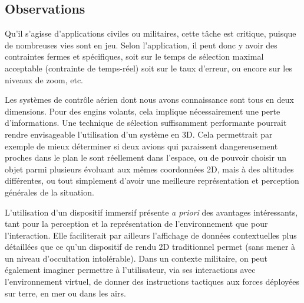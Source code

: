 	\addtocounter{footnote}{-1}
	\addtocounter{footnote}{1}
	
	\subsection{Observations}
	Qu'il s'agisse d'applications civiles ou militaires, cette tâche est critique, puisque de nombreuses vies sont en jeu. Selon l'application, il peut donc y avoir des contraintes fermes et spécifiques, soit sur le temps de sélection maximal acceptable (contrainte de temps-réel) soit sur le taux d'erreur, ou encore sur les niveaux de zoom, etc.

	Les systèmes de contrôle aérien dont nous avons connaissance sont tous en deux dimensions. Pour des engins volants, cela implique nécessairement une perte d'informations. Une technique de sélection suffisamment performante pourrait rendre envisageable l'utilisation d'un système en 3D. Cela permettrait par exemple de mieux déterminer si deux avions qui paraissent dangereusement proches dans le plan le sont réellement dans l'espace, ou de pouvoir choisir un objet parmi plusieurs évoluant aux mêmes coordonnées 2D, mais à des altitudes différentes, ou tout simplement d'avoir une meilleure représentation et perception générales de la situation.
	
	L'utilisation d'un dispositif immersif présente \emph{a priori} des avantages intéressants, tant pour la perception et la représentation de l'environnement que pour l'interaction. Elle faciliterait par ailleurs l'affichage de données contextuelles plus détaillées que ce qu'un dispositif de rendu 2D traditionnel permet (sans mener à un niveau d'occultation intolérable). Dans un contexte militaire, on peut également imaginer permettre à l'utilisateur, via ses interactions avec l'environnement virtuel, de donner des instructions tactiques aux forces déployées sur terre, en mer ou dans les airs.


